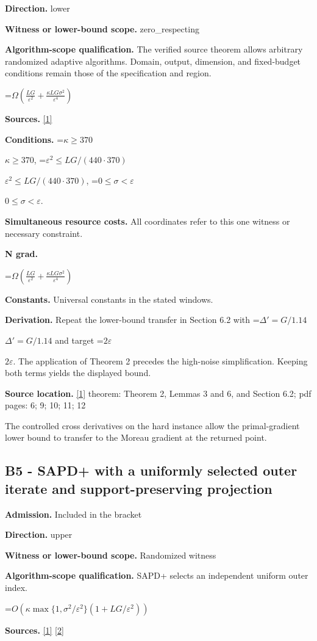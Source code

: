 \documentclass[10pt,a4paper]{article}
\newcommand{\AtlasMath}[1]{\par\begingroup\centering\setbox0=\hbox{$\displaystyle #1$}\ifdim\wd0>1.4\linewidth\typeout{ATLAS WIDE FORMULA: \the\wd0}\fi\ifdim\wd0>\linewidth\resizebox{\linewidth}{!}{\box0}\else\box0\fi\par\endgroup}
\newcommand{\AtlasInlineMath}[1]{\begingroup\setbox0=\hbox{$#1$}\ifdim\wd0>.4\linewidth\endgroup\AtlasMath{#1}\else\endgroup$#1$\fi}
\begin{document}
\textbf{Direction.} lower

\textbf{Witness or lower-bound scope.} zero\_respecting

\textbf{Algorithm-scope qualification.} The verified source theorem allows arbitrary randomized adaptive algorithms. Domain, output, dimension, and fixed-budget conditions remain those of the specification and region.

\AtlasMath{\Omega\!\left(\frac{LG}{\varepsilon^2}+\frac{\kappa LG\sigma^2}{\varepsilon^4}\right)}
\textbf{Sources.} \href{https://arxiv.org/pdf/2609.30877}{[1]}

\textbf{Conditions.} \AtlasInlineMath{\kappa\ge370}, \AtlasInlineMath{\varepsilon^2\le LG/(440\cdot370)}, \AtlasInlineMath{0\le\sigma<\varepsilon}.

\textbf{Simultaneous resource costs.} All coordinates refer to this one witness or necessary constraint.

\textbf{N grad.}

\AtlasMath{\Omega\!\left(\frac{LG}{\varepsilon^2}+\frac{\kappa LG\sigma^2}{\varepsilon^4}\right)}
\textbf{Constants.} Universal constants in the stated windows.

\textbf{Derivation.} Repeat the lower-bound transfer in Section 6.2 with \AtlasInlineMath{\Delta'=G/1.14} and target \AtlasInlineMath{2\varepsilon}. The application of Theorem 2 precedes the high-noise simplification. Keeping both terms yields the displayed bound.

\textbf{Source location.} \href{https://arxiv.org/pdf/2609.30877}{[1]} theorem: Theorem 2, Lemmas 3 and 6, and Section 6.2; pdf pages: 6; 9; 10; 11; 12

The controlled cross derivatives on the hard instance allow the primal-gradient lower bound to transfer to the Moreau gradient at the returned point.

\subsection{B5 - SAPD+ with a uniformly selected outer iterate and support-preserving projection}
\textbf{Admission.} Included in the bracket

\textbf{Direction.} upper

\textbf{Witness or lower-bound scope.} Randomized witness

\textbf{Algorithm-scope qualification.} SAPD+ selects an independent uniform outer index.

\AtlasMath{O\!\left(\kappa\max\{1,\sigma^2/\varepsilon^2\}\left(1+LG/\varepsilon^2\right)\right)}
\textbf{Sources.} \href{https://arxiv.org/pdf/2609.30877}{[1]} \href{https://arxiv.org/abs/2205.15084v4}{[2]}
\end{document}
